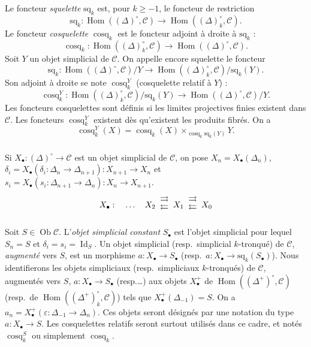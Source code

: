 \documentclass[11pt]{amsart}
\theoremstyle{plain}
\theoremstyle{definition}
\DeclareMathOperator{\Hom}{Hom}
\DeclareMathOperator{\cosq}{cosq}
\DeclareMathOperator{\Ob}{Ob}
\DeclareMathOperator{\Id}{Id}
\newcommand{\cC}{\mathcal{C}}
\begin{document}
Le foncteur \emph{squelette} $\mathrm{sq}_k$ est, pour $k \geq -1$, le foncteur de restriction
\[
\mathrm{sq}_k : \Hom((\Delta)^\circ, \cC) \to \Hom((\Delta)^\circ_k, \cC).
\]
Le foncteur \emph{cosquelette} $\cosq_k$ est le foncteur adjoint \`a droite \`a $\mathrm{sq}_k$ :
\[
\cosq_k : \Hom((\Delta)^\circ_k, \cC) \to \Hom((\Delta)^\circ, \cC).
\]
Soit $Y$ un objet simplicial de $\cC$. On appelle encore squelette le foncteur
\[
\mathrm{sq}_k : \Hom((\Delta)^\circ, \cC)/Y \to \Hom((\Delta)^\circ_k, \cC)/\mathrm{sq}_k(Y).
\]
Son adjoint \`a droite se note $\cosq_k^Y$ (cosquelette relatif \`a $Y$) :
\[
\cosq_k^Y : \Hom((\Delta)^\circ_k, \cC)/\mathrm{sq}_k(Y) \to \Hom((\Delta)^\circ, \cC)/Y.
\]
Les foncteurs cosquelettes sont d\'efinis si les limites projectives finies existent dans $\cC$.
Les foncteurs $\cosq_k^Y$ existent d\`es qu'existent les produits fibr\'es. On a
\[
\cosq_k^Y(X) = \cosq_k(X) \times_{\cosq_k \mathrm{sq}_k(Y)} Y.
\]

\subsubsection{}
Si $X_\bullet : (\Delta)^\circ \to \cC$ est un objet simplicial de $\cC$, on pose $X_n = X_\bullet(\Delta_n)$,
$\delta_i = X_\bullet(\delta_i : \Delta_n \to \Delta_{n+1}) : X_{n+1} \to X_n$ et $s_i = X_\bullet(s_i : \Delta_{n+1} \to \Delta_n) : X_n \to X_{n+1}$.
\[
X_\bullet : \quad \ldots\quad X_2 \;\;\raisebox{-5pt}{$\stackrel{\textstyle\rightrightarrows}{\raisebox{3pt}{$\leftleftarrows$}}$}\;\; X_1 \;\;\raisebox{-5pt}{$\stackrel{\textstyle\rightrightarrows}{\raisebox{3pt}{$\leftleftarrows$}}$}\;\; X_0
\]

\subsubsection{}
Soit $S \in \Ob\cC$. L'\emph{objet simplicial constant} $S_\bullet$ est l'objet simplicial pour lequel
$S_n = S$ et $\delta_i = s_i = \Id_S$. Un objet simplicial (resp.\ simplicial $k$-tronqu\'e) de $\cC$, \emph{augment\'e}
vers $S$, est un morphisme $a : X_\bullet \to S_\bullet$ (resp.\ $a : X_\bullet \to \mathrm{sq}_k(S_\bullet)$). Nous identifierons les
objets simpliciaux (resp.\ simpliciaux $k$-tronqu\'es) de $\cC$, augment\'es vers $S$, $a : X_\bullet \to S_\bullet$
(resp.\ldots) aux objets $X_\bullet^+$ de $\Hom((\Delta^+)^\circ, \cC)$ (resp.\ de $\Hom((\Delta^+)^\circ_k, \cC)$) tels que $X_\bullet^+(\Delta_{-1}) = S$.
On a $a_n = X_\bullet^+(\varepsilon : \Delta_{-1} \to \Delta_n)$. Ces objets seront d\'esign\'es par une notation du type $a : X_\bullet \to S$.
Les cosquelettes relatifs seront surtout utilis\'es dans ce cadre, et not\'es $\cosq_k^S$ ou simplement $\cosq_k$.
\end{document}
